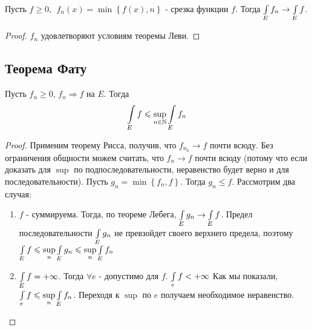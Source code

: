 \begin{corollary}
	Пусть $f \geqslant 0,  \:\: f_n(x) = \min\left\{f(x), n\right\}$ - срезка функции $f$. Тогда $\int\limits_{E} f_n \rightarrow \int\limits_{E} f$.
\end{corollary}

\begin{proof}
	$f_n$ удовлетворяют условиям теоремы Леви.
\end{proof}

\subsection{Теорема Фату}

\begin{theorem}
	Пусть $f_n \geqslant 0$, $f_n \Rightarrow f$ на $E$. Тогда \[\int\limits_{E} f \leqslant \sup\limits_{n \in \mathbb{N}} \int\limits_{E} f_n	\]
\end{theorem}

\begin{proof}
	Применим теорему Рисса, получив, что $f_{n_k} \rightarrow f$ почти всюду. Без ограничения общности можем считать, что $f_n \rightarrow f$ почти всюду
	(потому что если доказать для $\sup$ по подпоследовательности, неравенство будет верно и для последовательности).
	Пусть $g_n = \min\left\{f_n, f\right\}$. Тогда $g_n \leqslant f$.
	Рассмотрим два случая:
	\begin{enumerate}
		\item 
			$f$ - суммируема.
			Тогда, по теореме Лебега, $\int\limits_{E} g_n \rightarrow \int\limits_{E} f$. Предел последовательности $\int\limits_{E} g_n$ не превзойдет своего верхнего предела, 
			поэтому $\int\limits_{E} f \leqslant \sup\limits_{n} \int\limits_{E} g_n \leqslant \sup\limits_{n}\int\limits_{E} f_n$
		\item
			$\int\limits_{E} f = +\infty$. Тогда $\forall e$ - допустимо для $f$. $\int\limits_{e} f < +\infty$
			Как мы показали, $\int\limits_{e} f \leqslant \sup\limits_{n}\int\limits_{E} f_n$. Переходя к $\sup$ по $e$ получаем необходимое неравенство.
	\end{enumerate}
\end{proof}

\newpage
